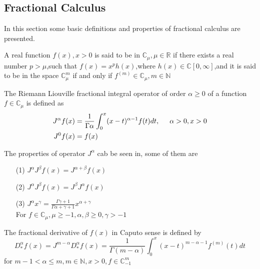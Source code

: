 
\subsection{Fractional Calculus} 

In this section some basic definitions and properties of fractional calculus are presented.
\begin{definition} A real function $f(x),x>0$ is said to be in $\mathbb{C}_{\mu},\mu \in \mathbb{R}$ if there exists a real number $p>\mu$,such that $f(x)=x^{p}h(x)$,where $h(x)\in \mathbb{C}[0,\infty]$,and it is said to be in the space $\mathbb{C}^{m}_{\mu}$ if and only if $f^{(m)} \in \mathbb{C}_{\mu},m\in \mathbb{N}$
\end{definition}

\begin{definition} The Riemann Liouville fractional integral operator of order $ \alpha \geq 0 $ of a function $ f \in \mathbb{C}_{\mu}$ is defined as
\begin{align*}
J^{\alpha}f(x)&=\frac{1}{\Gamma{\alpha}}\int_{0}^{x}(x-t)^{\alpha-1}f(t)dt,\hspace{0.5cm} \alpha >0,x>0\\
J^{0}f(x)&=f(x)
\end{align*}
\end{definition}
The properties of operator $ J^{\alpha} $ cab be seen in, some of them are
\begin{itemize}
\item[(1)]$ J^{\alpha}J^{\beta}f(x)=J^{\alpha+\beta}f(x) $
\item[(2)]$ J^{\alpha}J^{\beta}f(x)=J^{\beta}J^{\alpha}f(x) $
\item[(3)]$ J^{\alpha}x^{\gamma}=\frac{\Gamma{\gamma+1}}{\Gamma{\alpha+\gamma+1}}x^{\alpha+\gamma}$\\
For $ f \in \mathbb{C}_{\mu},\mu\geq -1,\alpha,\beta\geq 0,\gamma > -1 $
\end{itemize}
\begin{definition}
The fractional derivative of $f(x)$ in Caputo sense is defined by
\begin{equation*}
D^{\alpha}_{*}f(x)=J^{m-\alpha}D^{\alpha}_{*}f(x)=\frac{1}{\Gamma{(m-\alpha)}}\int_{0}^{x}(x-t)^{m-\alpha-1}f^{(m)}(t)dt
\end{equation*}
for $ m-1 < \alpha \leq m,m\in \mathbb{N},x > 0,f\in \mathbb{C}_{-1}^{m}$
\end{definition}

